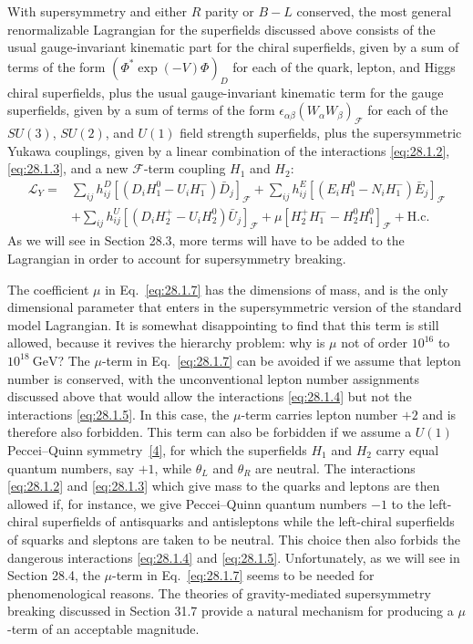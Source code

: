 With supersymmetry and either \(R\) parity or \(B-L\) conserved, the
most general renormalizable Lagrangian for the superfields discussed
above consists of the usual gauge-invariant kinematic part for the
chiral superfields, given by a sum of terms of the form
\((\Phi^*\exp(-V)\Phi)_D\) for each of the quark, lepton, and Higgs
chiral superfields, plus the usual gauge-invariant kinematic term for
the gauge superfields, given by a sum of terms of the form
\(\epsilon_{\alpha\beta}(W_\alpha W_\beta)_{\mathcal{F}}\) for each of
the \(SU(3)\), \(SU(2)\), and \(U(1)\) field strength superfields, plus
the supersymmetric Yukawa couplings, given by a linear combination of
the interactions \eqref{eq:28.1.2}, \eqref{eq:28.1.3}, and a new
\(\mathcal{F}\)-term coupling \(H_1\) and \(H_2\):
\begin{equation}
  \begin{aligned}
  \mathcal{L}_Y={}&
  \sum_{ij}h_{ij}^{D}
    \left[(D_iH_1^0-U_iH_1^-)\bar D_j\right]_{\mathcal{F}}
  +\sum_{ij}h_{ij}^{E}
    \left[(E_iH_1^0-N_iH_1^-)\bar E_j\right]_{\mathcal{F}}
  \\
  &+\sum_{ij}h_{ij}^{U}
    \left[(D_iH_2^+-U_iH_2^0)\bar U_j\right]_{\mathcal{F}}
  +\mu\left[H_2^+H_1^- -H_2^0H_1^0\right]_{\mathcal{F}}
  +\mathrm{H.c.}
  \end{aligned}
  \tag{28.1.7}\label{eq:28.1.7}
\end{equation}
As we will see in Section 28.3, more terms will have to be added to the
Lagrangian in order to account for supersymmetry breaking.

The coefficient \(\mu\) in Eq.~\eqref{eq:28.1.7} has the dimensions of
mass, and is the only dimensional parameter that enters in the
supersymmetric version of the standard model Lagrangian. It is somewhat
disappointing to find that this term is still allowed, because it
revives the hierarchy problem: why is \(\mu\) not of order \(10^{16}\)
to \(10^{18}\ \mathrm{GeV}\)? The \(\mu\)-term in
Eq.~\eqref{eq:28.1.7} can be avoided if we assume that lepton number is
conserved, with the unconventional lepton number assignments discussed
above that would allow the interactions \eqref{eq:28.1.4} but not the
interactions \eqref{eq:28.1.5}. In this case, the \(\mu\)-term carries
lepton number \(+2\) and is therefore also forbidden. This term can also
be forbidden if we assume a \(U(1)\) Peccei--Quinn
symmetry~\hyperref[ch28-ref-4]{[4]}, for which the superfields \(H_1\)
and \(H_2\) carry equal quantum numbers, say \(+1\), while \(\theta_L\)
and \(\theta_R\) are neutral. The interactions \eqref{eq:28.1.2} and
\eqref{eq:28.1.3} which give mass to the quarks and leptons are then
allowed if, for instance, we give Peccei--Quinn quantum numbers \(-1\)
to the left-chiral superfields of antisquarks and antisleptons while the
left-chiral superfields of squarks and sleptons are taken to be neutral.
This choice then also forbids the dangerous interactions
\eqref{eq:28.1.4} and \eqref{eq:28.1.5}. Unfortunately, as we will see
in Section 28.4, the \(\mu\)-term in Eq.~\eqref{eq:28.1.7} seems to be
needed for phenomenological reasons. The theories of gravity-mediated
supersymmetry breaking discussed in Section 31.7 provide a natural
mechanism for producing a \(\mu\)-term of an acceptable magnitude.

